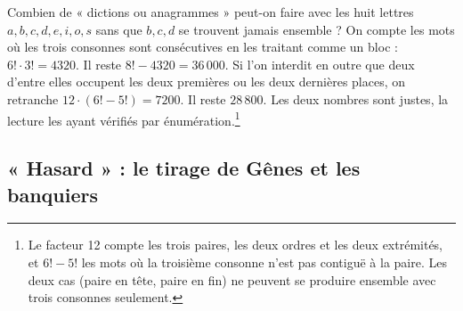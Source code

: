 \documentclass[11pt,a4paper]{article}
\begin{document}
Combien de « dictions ou anagrammes » peut-on faire avec les huit lettres
\(a,b,c,d,e,i,o,s\) sans que \(b,c,d\) se trouvent jamais ensemble ? On compte
les mots où les trois consonnes sont consécutives en les traitant comme un
bloc : \(6!\cdot3!=4320\). Il reste \(8!-4320=36\,000\). Si l'on interdit en
outre que deux d'entre elles occupent les deux premières ou les deux dernières
places, on retranche \(12\cdot(6!-5!)=7200\). Il reste \(28\,800\). Les deux
nombres sont justes, la lecture les ayant vérifiés par énumération.\footnote{Le
facteur 12 compte les trois paires, les deux ordres et les deux extrémités, et
\(6!-5!\) les mots où la troisième consonne n'est pas contiguë à la paire. Les
deux cas (paire en tête, paire en fin) ne peuvent se produire ensemble avec
trois consonnes seulement.}

\subsection*{« Hasard » : le tirage de Gênes et les banquiers}
\end{document}
